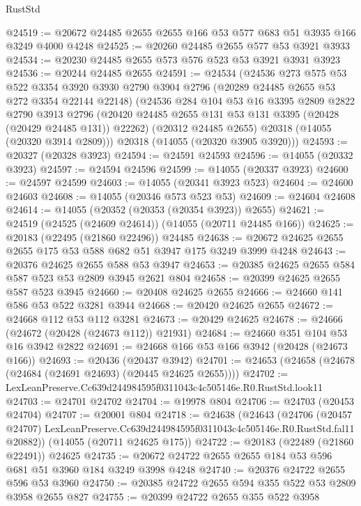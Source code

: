 \begin{lexlean}{RustStd}
\begin{coremodule}
@24519 := @20672 @24485 @2655 @2655 @166 @53 @577 @683 @51 @3935 @166 @3249 @4000 @4248
@24525 := @20260 @24485 @2655 @577 @53 @3921 @3933
@24534 := @20230 @24485 @2655 @573 @576 @523 @53 @3921 @3931 @3923
@24536 := @20244 @24485 @2655
@24591 := @24534
    (@24536
      @273
      @575
      @53
      @522
      @3354
      @3920
      @3930
      @2790
      @3904
      @2796
      (@20289 @24485 @2655 @53 @272 @3354 @22144 @22148)
      (@24536
        @284
        @104
        @53
        @16
        @3395
        @2809
        @2822
        @2790
        @3913
        @2796
        (@20420 @24485 @2655 @131 @53 @131 @3395 (@20428 (@20429 @24485 @131)) @22262)
        (@20312 @24485 @2655)
        @20318
        (@14055 (@20320 @3914 @2809)))
      @20318
      (@14055 (@20320 @3905 @3920)))
@24593 := @20327 (@20328 @3923)
@24594 := @24591 @24593
@24596 := @14055 (@20332 @3923)
@24597 := @24594 @24596
@24599 := @14055 (@20337 @3923)
@24600 := @24597 @24599
@24603 := @14055 (@20341 @3923 @523)
@24604 := @24600 @24603
@24608 := @14055 (@20346 @573 @523 @53)
@24609 := @24604 @24608
@24614 := @14055 (@20352 (@20353 (@20354 @3923)) @2655)
@24621 := @24519 (@24525 (@24609 @24614)) (@14055 (@20711 @24485 @166))
@24625 := @20183 (@22495 (@21860 @22496)) @24485
@24638 := @20672 @24625 @2655 @2655 @175 @53 @588 @682 @51 @3947 @175 @3249 @3999 @4248
@24643 := @20376 @24625 @2655 @588 @53 @3947
@24653 := @20385 @24625 @2655 @584 @587 @523 @53 @2809 @3945 @2621 @804
@24658 := @20399 @24625 @2655 @587 @523 @3945
@24660 := @20408 @24625 @2655
@24666 := @24660 @141 @586 @53 @522 @3281 @3944
@24668 := @20420 @24625 @2655
@24672 := @24668 @112 @53 @112 @3281
@24673 := @20429 @24625
@24678 := @24666 (@24672 (@20428 (@24673 @112)) @21931)
@24684 := @24660 @351 @104 @53 @16 @3942 @2822
@24691 := @24668 @166 @53 @166 @3942 (@20428 (@24673 @166))
@24693 := @20436 (@20437 @3942)
@24701 := @24653 (@24658 (@24678 (@24684 (@24691 @24693) (@20445 @24625 @2655))))
@24702 := LexLeanPreserve.Cc639d244984595f0311043c4c505146e.R0.RustStd.look11
@24703 := @24701 @24702
@24704 := @19978 @804
@24706 := @24703 (@20453 @24704)
@24707 := @20001 @804
@24718 := @24638
    (@24643
      (@24706
        (@20457 @24707)
        LexLeanPreserve.Cc639d244984595f0311043c4c505146e.R0.RustStd.fal11
        @20882))
    (@14055 (@20711 @24625 @175))
@24722 := @20183 (@22489 (@21860 @22491)) @24625
@24735 := @20672 @24722 @2655 @2655 @184 @53 @596 @681 @51 @3960 @184 @3249 @3998 @4248
@24740 := @20376 @24722 @2655 @596 @53 @3960
@24750 := @20385 @24722 @2655 @594 @355 @522 @53 @2809 @3958 @2655 @827
@24755 := @20399 @24722 @2655 @355 @522 @3958

\end{coremodule}
\end{lexlean}
